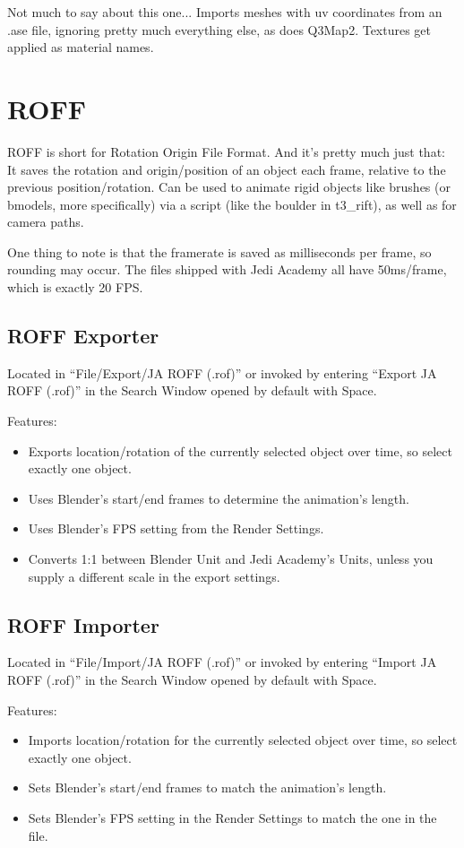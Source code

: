 \documentclass[a4paper,10pt]{article}
\begin{document}
 Not much to say about this one... Imports meshes with uv coordinates from an .ase file, ignoring pretty much
 everything else, as does Q3Map2. Textures get applied as material names.
 
 \section{ROFF}
 
 ROFF is short for Rotation Origin File Format. And it's pretty much just that: It saves the rotation and
 origin/position of an object each frame, relative to the previous position/rotation. Can be used to animate
 rigid objects like brushes (or bmodels, more specifically) via a script (like the boulder in t3\_rift), as
 well as for camera paths.
 
 One thing to note is that the framerate is saved as milliseconds per frame, so rounding may occur. The
 files shipped with Jedi Academy all have 50ms/frame, which is exactly 20 FPS.
 
 \subsection{ROFF Exporter}
 
 Located in ``File/Export/JA ROFF (.rof)'' or invoked by entering ``Export JA ROFF (.rof)'' in the Search Window
 opened by default with Space.
 
 Features:
 \begin{itemize}
  \item Exports location/rotation of the currently selected object over time, so select exactly one object.
  \item Uses Blender's start/end frames to determine the animation's length.
  \item Uses Blender's FPS setting from the Render Settings.
  \item Converts 1:1 between Blender Unit and Jedi Academy's Units, unless you supply a different scale in
  the export settings.
 \end{itemize}

 \subsection{ROFF Importer}
 
 Located in ``File/Import/JA ROFF (.rof)'' or invoked by entering ``Import JA ROFF (.rof)'' in the Search Window
 opened by default with Space.
 
 Features:
 \begin{itemize}
  \item Imports location/rotation for the currently selected object over time, so select exactly one object.
  \item Sets Blender's start/end frames to match the animation's length.
  \item Sets Blender's FPS setting in the Render Settings to match the one in the file.
 \end{itemize}
 
\end{document}
